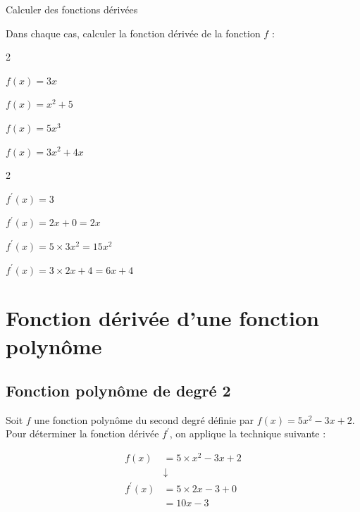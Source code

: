\begin{methodeTitre}{Calculer des fonctions dérivées}
	
Dans chaque cas, calculer la fonction dérivée de la fonction $f$ :
\begin{enumMet}
\begin{multicols}{2}
	\item $f(x)=3 x$
	\item $f(x)=x^{2}+5$
	\item $f(x)=5 x^{3}$
	\item $f(x)=3 x^{2}+4 x$	
\end{multicols}
	
\end{enumMet}

\begin{enumMet}
	\begin{multicols}{2}
		\item $f^{\prime}(x)=3$
		\item $f^{\prime}(x)=2 x+0=2 x$
		\item $f^{\prime}(x)=5 \times 3 x^{2}=15 x^{2}$
		\item $f^{\prime}(x)=3 \times 2 x+4=6 x+4$
	\end{multicols}
	
\end{enumMet}
\end{methodeTitre}

\section{Fonction dérivée d'une fonction polynôme}

\subsection{Fonction polynôme de degré 2}

Soit $f$ une fonction polynôme du second degré définie par $f(x)=5 x^{2}-3 x+2$.\\
Pour déterminer la fonction dérivée $f^{\prime}$, on applique la technique suivante :

$$
\begin{aligned}
	f(x)&=5 \times x^{2}-3 x+2 \\
	& \downarrow \\
	f^{\prime}(x)&=5 \times 2 x-3+0 \\
	&=10 x-3
\end{aligned}
$$

